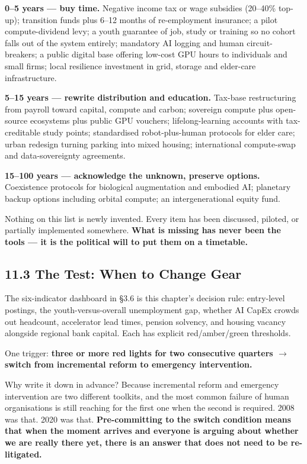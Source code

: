 \documentclass[11pt,a4paper]{article}
\begin{document}
\textbf{0--5 years --- buy time.} Negative income tax or wage subsidies (20--40\% top-up); transition funds plus 6--12 months of re-employment insurance; a pilot compute-dividend levy; a youth guarantee of job, study or training so no cohort falls out of the system entirely; mandatory AI logging and human circuit-breakers; a public digital base offering low-cost GPU hours to individuals and small firms; local resilience investment in grid, storage and elder-care infrastructure.

\textbf{5--15 years --- rewrite distribution and education.} Tax-base restructuring from payroll toward capital, compute and carbon; sovereign compute plus open-source ecosystems plus public GPU vouchers; lifelong-learning accounts with tax-creditable study points; standardised robot-plus-human protocols for elder care; urban redesign turning parking into mixed housing; international compute-swap and data-sovereignty agreements.

\textbf{15--100 years --- acknowledge the unknown, preserve options.} Coexistence protocols for biological augmentation and embodied AI; planetary backup options including orbital compute; an intergenerational equity fund.

Nothing on this list is newly invented. Every item has been discussed, piloted, or partially implemented somewhere. \textbf{What is missing has never been the tools --- it is the political will to put them on a timetable.}

\subsection{11.3 The Test: When to Change Gear}

The six-indicator dashboard in \S{}3.6 is this chapter's decision rule: entry-level postings, the youth-versus-overall unemployment gap, whether AI CapEx crowds out headcount, accelerator lead times, pension solvency, and housing vacancy alongside regional bank capital. Each has explicit red/amber/green thresholds.

One trigger: \textbf{three or more red lights for two consecutive quarters $\to$ switch from incremental reform to emergency intervention.}

Why write it down in advance? Because incremental reform and emergency intervention are two different toolkits, and the most common failure of human organisations is still reaching for the first one when the second is required. 2008 was that. 2020 was that. \textbf{Pre-committing to the switch condition means that when the moment arrives and everyone is arguing about whether we are really there yet, there is an answer that does not need to be re-litigated.}
\end{document}
